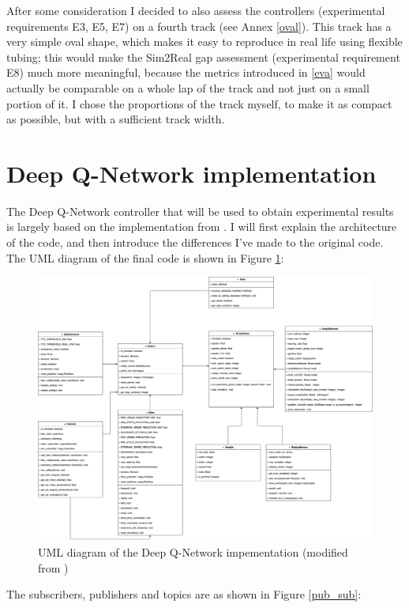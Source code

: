 After some consideration I decided to also assess the controllers (experimental requirements E3, E5, E7) on a fourth track (see Annex \ref{oval}). This track has a very simple oval shape, which makes it easy to reproduce in real life using flexible tubing; this would make the Sim2Real gap assessment (experimental requirement E8) much more meaningful, because the metrics introduced in \ref{eva} would actually be comparable on a whole lap of the track and not just on a small portion of it. I chose the proportions of the track myself, to make it as compact as possible, but with a sufficient track width.


\section{Deep Q-Network implementation}
The Deep Q-Network controller that will be used to obtain experimental results is largely based on the implementation from \cite{bosello}. I will first explain the architecture of the code, and then introduce the differences I've made to the original code. \\
The UML diagram of the final code is shown in Figure \ref{uml}:
\begin{figure}[H]
\centering
\includegraphics[scale=0.33]{Figures/UML_diagram.png}
\caption{UML diagram of the Deep Q-Network impementation (modified from \cite{bosello})}
\label{uml}
\end{figure}
The subscribers, publishers and topics are as shown in Figure \ref{pub_sub}:
